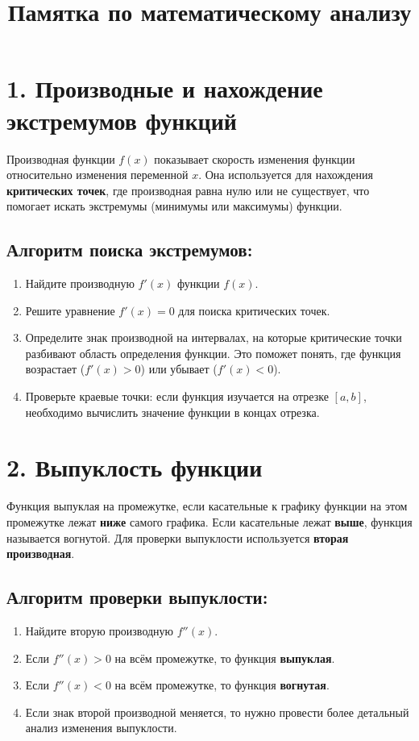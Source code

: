 \documentclass[a4paper,12pt]{article}
\begin{document}
\title{Памятка по математическому анализу}
\author{}
\date{}
\maketitle

\section*{1. Производные и нахождение экстремумов функций}

Производная функции \( f(x) \) показывает скорость изменения функции относительно изменения переменной \( x \). Она используется для нахождения \textbf{критических точек}, где производная равна нулю или не существует, что помогает искать экстремумы (минимумы или максимумы) функции.

\subsection*{Алгоритм поиска экстремумов:}
\begin{enumerate}
    \item Найдите производную \( f'(x) \) функции \( f(x) \).
    \item Решите уравнение \( f'(x) = 0 \) для поиска критических точек.
    \item Определите знак производной на интервалах, на которые критические точки разбивают область определения функции. Это поможет понять, где функция возрастает (\( f'(x) > 0 \)) или убывает (\( f'(x) < 0 \)).
    \item Проверьте краевые точки: если функция изучается на отрезке \( [a, b] \), необходимо вычислить значение функции в концах отрезка.
\end{enumerate}

\section*{2. Выпуклость функции}

Функция выпуклая на промежутке, если касательные к графику функции на этом промежутке лежат \textbf{ниже} самого графика. Если касательные лежат \textbf{выше}, функция называется вогнутой. Для проверки выпуклости используется \textbf{вторая производная}.

\subsection*{Алгоритм проверки выпуклости:}
\begin{enumerate}
    \item Найдите вторую производную \( f''(x) \).
    \item Если \( f''(x) > 0 \) на всём промежутке, то функция \textbf{выпуклая}.
    \item Если \( f''(x) < 0 \) на всём промежутке, то функция \textbf{вогнутая}.
    \item Если знак второй производной меняется, то нужно провести более детальный анализ изменения выпуклости.
\end{enumerate}
\end{document}
